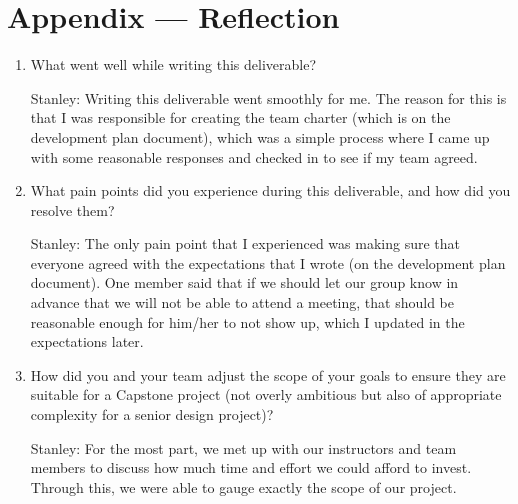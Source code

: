 \documentclass{article}
\begin{document}
\newpage{}

\section*{Appendix --- Reflection}




\begin{enumerate}
    \item What went well while writing this deliverable? 
    
Stanley: Writing this deliverable went smoothly for me. The reason for this is that I was responsible for creating the team charter (which is on the development plan document), which was a simple process where I came up with some reasonable responses and checked in to see if my team agreed. 

    \item What pain points did you experience during this deliverable, and how
    did you resolve them?

Stanley: The only pain point that I experienced was making sure that everyone agreed with the expectations that I wrote (on the development plan document). One member said that if we should let our group know in advance that we will not be able to attend a meeting, that should be reasonable enough for him/her to not show up, which I updated in the expectations later.  

    \item How did you and your team adjust the scope of your goals to ensure
    they are suitable for a Capstone project (not overly ambitious but also of
    appropriate complexity for a senior design project)?

Stanley: For the most part, we met up with our instructors and team members to discuss how much time and effort we could afford to invest. Through this, we were able to gauge exactly the scope of our project.  

\end{enumerate}  
\end{document}
